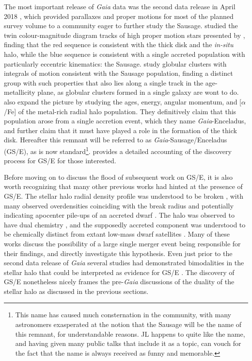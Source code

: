 The most important release of \textit{Gaia} data was the second data release in April 2018 \parencite{gaiadr2}, which provided parallaxes and proper motions for most of the planned survey volume to a community eager to further study the Sausage. \textcite{haywood18} studied the twin colour-magnitude diagram tracks of high proper motion stars presented by \textcite{gaiadr2_hrdiagram}, finding that the red sequence is consistent with the thick disk and the \textit{in-situ} halo, while the blue sequence is consistent with a single accreted population with particularly eccentric kinematics: the Sausage. \textcite{myeong18} study globular clusters with integrals of motion consistent with the Sausage population, finding a distinct group with such properties that also lies along a single track in the age-metallicity plane, as globular clusters formed in a single galaxy are wont to do. \textcite{helmi18} also expand the picture by studying the ages, energy, angular momentum, and [$\alpha$/Fe] of the metal-rich radial halo population. They definitively claim that this population arose from a single accretion event, which they name \textit{Gaia}-Enceladus, and further claim that it must have played a role in the formation of the thick disk. Hereafter this remnant will be referred to as \textit{Gaia}-Sausage/Enceladus (GS/E), as is now standard\footnote{This name has caused much consternation in the community, with many astronomers exasperated at the notion that the Sausage will be the name of this remnant, for understandable reasons. JL happens to quite like the name, and having given many public talks that include it as a topic, can vouch for the fact that the name is always received as funny and memorable.}. \textcite{deason24} provides a detailed accounting of the discovery process for GS/E for those interested.

Before moving on to discuss the flood of subsequent work on GS/E, it is also worth recognizing that many other previous works had hinted at the presence of GS/E. The stellar halo radial density profile was understood to be broken \parencite{deason11,sesar11}, with many observed overdensities coinciding with the break radius and potentially indicating apocenter pile-ups of an accreted dwarf \parencite{li16}. The halo was observed to have dual chemistry \parencite{carollo07,nissen10}, and the supposedly accreted component was understood to be chemically distinct from extant low-mass dwarf satellites \parencite{venn04}. Many of these works discuss the possibility of a large single merger event being responsible for their findings, and \textcite{deason13} directly investigate this hypothesis. Even just prior to the second data release of \textit{Gaia} several studies had demonstrated bimodalities in the stellar halo that could be interpreted as evidence for GS/E \parencite{bonaca17,deason17,hayes18}. The discovery of GS/E nonetheless nicely frames the pre-\textit{Gaia} discussions of the duality of the stellar halo as discussed in the previous sections.


